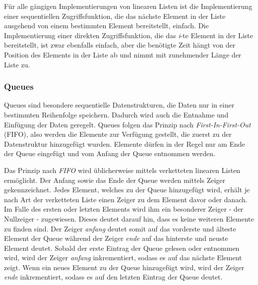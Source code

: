 Für alle gängigen Implementierungen von linearen Listen ist die Implementierung einer sequentiellen Zugriffsfunktion, die das nächste Element in der Liste ausgehend von einem bestimmten Element bereitstellt, einfach. Die Implementierung einer direkten Zugriffsfunktion, die das \textit{i}-te Element in der Liste bereitstellt, ist zwar ebenfalls einfach, aber die benötigte Zeit hängt von der Position des Elements in der Liste ab und nimmt mit zunehmender Länge der Liste zu.\autocite[45]{ollmert_datenstrukturen_2020}

\subsubsection{Queues}
Queues sind besondere sequentielle Datenstrukturen, die Daten nur in einer bestimmten Reihenfolge speichern. Dadurch wird auch die Entnahme und Einfügung der Daten geregelt. Queues folgen das Prinzip nach \textit{First-In-First-Out} (FIFO), also werden die Elemente zur Verfügung gestellt, die zuerst zu der Datenstruktur hinzugefügt wurden. Elemente dürfen in der Regel nur am Ende der Queue eingefügt und vom Anfang der Queue entnommen werden. \autocite[371]{gumm_band_2016}

Das Prinzip nach \textit{FIFO} wird üblicherweise mittels verketteten linearen Listen ermöglicht. Der Anfang sowie das Ende der Queue werden mittels Zeiger gekennzeichnet. Jedes Element, welches zu der Queue hinzugefügt wird, erhält je nach Art der verketteten Liste einen Zeiger zu dem Element davor oder danach. Im Falle des ersten oder letzten Elements wird ihm ein besonderer Zeiger - der Nullzeiger - zugewiesen. Dieses deutet darauf hin, dass es keine weiteren Elemente zu finden sind. Der Zeiger \textit{anfang} deutet somit auf das vorderste und älteste Element der Queue während der Zeiger \textit{ende} auf das hinterste und neuste Element deutet. Sobald der erste Eintrag der Queue gelesen oder entnommen wird, wird der Zeiger \textit{anfang} inkrementiert, sodass es auf das nächste Element zeigt. Wenn ein neues Element zu der Queue hinzugefügt wird, wird der Zeiger \textit{ende} inkrementiert, sodass es auf den letzten Eintrag der Queue deutet. \autocite[48-49]{ollmert_datenstrukturen_2020} \autocite[371]{gumm_band_2016}

